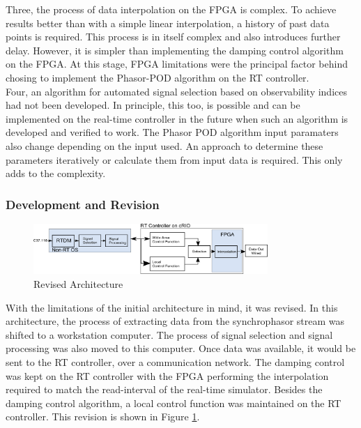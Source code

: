 \documentclass[conference]{IEEEtran}
\begin{document}
Three, the process of data interpolation on the FPGA is complex. To achieve results better than with a simple linear interpolation, a history of past data points is required. This process is in itself complex and also introduces further delay. However, it is simpler than implementing the damping control algorithm on the FPGA. At this stage, FPGA limitations were the principal factor behind chosing to implement the Phasor-POD algorithm on the RT controller.\\

Four, an algorithm for automated signal selection based on observability indices had not been developed. In principle, this too, is possible and can be implemented on the real-time controller in the future when such an algorithm is developed and verified to work. The Phasor POD algorithm input paramaters also change depending on the input used. An approach to determine these parameters iteratively or calculate them from input data is required. This only adds to the complexity.\\

\subsubsection{Development and Revision}

\begin{figure}[!t]
\centering
\includegraphics[width=3.5in]{Revision.png}
\caption{Revised Architecture}
\label{fig:Revision}
\end{figure}

With the limitations of the initial architecture in mind, it was revised. In this architecture, the process of  extracting data from the synchrophasor stream was shifted to a workstation computer. The process of signal selection and signal processing was also moved to this computer. Once data was available, it would be sent to the RT controller, over a communication network. The damping control was kept on the RT controller with the FPGA performing the interpolation required to match the read-interval of the real-time simulator. Besides the damping control algorithm, a local control function was maintained on the RT controller. This revision is shown in Figure \ref{fig:Revision}.\\
\end{document}
